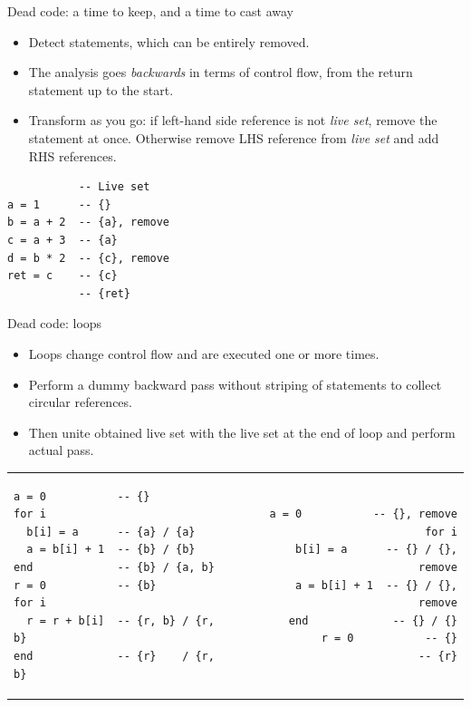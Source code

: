 \documentclass[handout]{beamer}
\begin{document}
\begin{frame}[fragile]{Dead code: a time to keep, and a time to cast away}

\begin{itemize}

\item Detect statements, which can be entirely removed.

\item The analysis goes {\em backwards} in terms of control flow, from the return statement up to the start.

\item Transform as you go: if left-hand side reference is not {\em live set}, remove the statement at once. Otherwise remove LHS reference from {\em live set} and add RHS references.

\end{itemize}

\begin{lstlisting}
           -- Live set
a = 1      -- {}
b = a + 2  -- {a}, remove
c = a + 3  -- {a}
d = b * 2  -- {c}, remove
ret = c    -- {c}
           -- {ret}
\end{lstlisting}

\end{frame}

\begin{frame}[fragile]{Dead code: loops}
\begin{adjustwidth}{-1em}{-1em}

\begin{itemize}
\item Loops change control flow and are executed one or more times.
\item Perform a dummy backward pass without striping of statements to collect circular references.
\item Then unite obtained live set with the live set at the end of loop and perform actual pass.
\end{itemize}

\bigskip

\begin{tabular}{l@{}r}

\begin{lstlisting}
a = 0           -- {}
for i
  b[i] = a      -- {a} / {a}
  a = b[i] + 1  -- {b} / {b}
end             -- {b} / {a, b}
r = 0           -- {b}
for i
  r = r + b[i]  -- {r, b} / {r, b}
end             -- {r}    / {r, b}
\end{lstlisting}

&

\begin{lstlisting}
a = 0           -- {}, remove
for i
  b[i] = a      -- {} / {}, remove
  a = b[i] + 1  -- {} / {}, remove
end             -- {} / {}
r = 0           -- {}
                -- {r}
\end{lstlisting}

\end{tabular}

\end{adjustwidth}
\end{frame}
\end{document}
